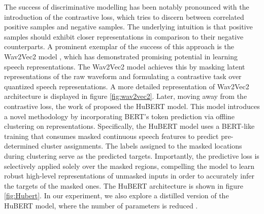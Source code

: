 The success of discriminative modelling has been notably pronounced with the introduction of the contrastive loss, which tries to discern between correlated positive samples and negative samples. The underlying intuition is that positive samples should exhibit closer representations in comparison to their negative counterparts. A prominent exemplar of the success of this approach is the Wav2Vec2 model \cite{baevski2020wav2vec}, which has demonstrated promising potential in learning speech representations. The Wav2Vec2 model achieves this by masking latent representations of the raw waveform and formulating a contrastive task over quantized speech representations. A more detailed representation of Wav2Vec2 architecture is displayed in figure \ref{fig:wav2vec2}. Later, moving away from the contrastive loss, the work of \cite{hsu2021hubert} proposed the HuBERT model. This model introduces a novel methodology by incorporating BERT's token prediction via offline clustering on representations. Specifically, the HuBERT model uses a BERT-like training that consumes masked continuous speech features to predict pre-determined cluster assignments. The labels assigned to the masked locations during clustering serve as the predicted targets. Importantly, the predictive loss is selectively applied solely over the masked regions, compelling the model to learn robust high-level representations of unmasked inputs in order to accurately infer the targets of the masked ones. The HuBERT architecture is shown in figure \ref{fig:Hubert}. In our experiment, we also explore a distilled version of the HuBERT model, where the number of parameters is reduced \cite{chang2022distilhubert}.

